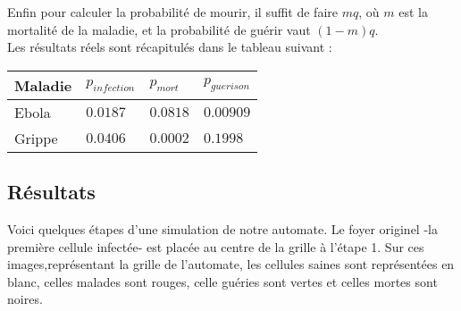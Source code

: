 \documentclass{article}
\begin{document}
Enfin pour calculer la probabilité de mourir, il suffit de faire $mq$, où $m$ est la mortalité de la maladie, et la probabilité de guérir vaut $(1-m)q$. \\
Les résultats réels sont récapitulés dans le tableau suivant :

\begin{tabular} {| p{2cm} | p{2cm}| p{2cm} | p{2cm} |}
	\hline
	Maladie & $p_{infection}$ & $p_{mort}$ & $p_{guerison}$ \\ \hline
	Ebola & $0.0187$ & $0.0818$ & $0.00909$ \\ \hline
	Grippe & $0.0406$ & $0.0002$ & $0.1998$ \\
	\hline
\end{tabular}

\subsection{Résultats}

Voici quelques étapes d'une simulation de notre automate. Le foyer originel -la première cellule infectée- est placée au centre de la grille à l'étape 1. Sur ces images,représentant la grille de l'automate, les cellules saines sont représentées en blanc, celles malades sont rouges, celle guéries sont vertes et celles mortes sont noires.
\end{document}
